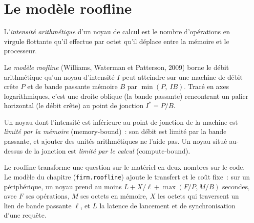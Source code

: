\section{Le modèle roofline}

\begin{definition}\label{def:pl:accelerators-for-quantitative-work:intensity}
L'\emph{intensité arithmétique} d'un noyau de calcul est le nombre d'opérations en virgule flottante qu'il effectue par octet
qu'il déplace entre la mémoire et le processeur.
\end{definition}

\begin{definition}\label{def:pl:accelerators-for-quantitative-work:roofline}
Le \emph{modèle roofline} (Williams, Waterman et Patterson, 2009) borne le débit arithmétique qu'un noyau d'intensité
$I$ peut atteindre sur une machine de débit crête $P$ et de bande passante mémoire $B$ par $\min(P,\ I B)$. Tracé en axes logarithmiques, c'est une droite
oblique (la bande passante) rencontrant un palier horizontal (le débit crête) au point de jonction $I^* = P/B$.
\end{definition}

\begin{definition}\label{def:pl:accelerators-for-quantitative-work:bound}
Un noyau dont l'intensité est inférieure au point de jonction de la machine est \emph{limité par la mémoire} (memory-bound)~: son débit
est limité par la bande passante, et ajouter des unités arithmétiques ne l'aide pas. Un noyau situé au-dessus de la jonction est \emph{limité par le calcul} (compute-bound).
\end{definition}

Le roofline transforme une question sur le matériel en deux nombres sur le code. Le modèle du chapitre (\texttt{firm.roofline}) ajoute le transfert
et le coût fixe~: sur un périphérique, un noyau prend au moins $L + X/\ell + \max(F/P, M/B)$ secondes, avec $F$ ses opérations, $M$ ses octets
en mémoire, $X$ les octets qui traversent un lien de bande passante $\ell$, et $L$ la latence de lancement et de synchronisation d'une requête.

\label{lst:pl:accelerators-for-quantitative-work:roof}

